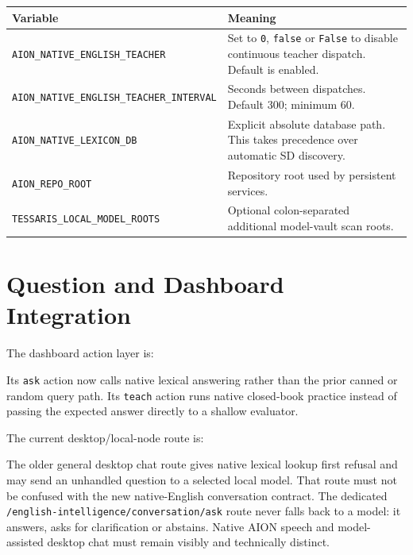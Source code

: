 \documentclass[11pt,a4paper]{article}
\begin{document}
\begin{longtable}{p{} p{}}
\toprule
Variable & Meaning \\
\midrule
\endhead
\texttt{AION\_NATIVE\_ENGLISH\_TEACHER} & Set to \texttt{0}, \texttt{false} or
\texttt{False} to disable continuous teacher dispatch. Default is enabled. \\
\texttt{AION\_NATIVE\_ENGLISH\_TEACHER\_INTERVAL} & Seconds between dispatches. Default 300;
minimum 60. \\
\texttt{AION\_NATIVE\_LEXICON\_DB} & Explicit absolute database path. This takes precedence
over automatic SD discovery. \\
\texttt{AION\_REPO\_ROOT} & Repository root used by persistent services. \\
\texttt{TESSARIS\_LOCAL\_MODEL\_ROOTS} & Optional colon-separated additional model-vault
scan roots. \\
\bottomrule
\end{longtable}

\section{Question and Dashboard Integration}

The dashboard action layer is:

\begin{quote}
\end{quote}

Its \texttt{ask} action now calls native lexical answering rather than the prior canned or
random query path. Its \texttt{teach} action runs native closed-book practice instead of
passing the expected answer directly to a shallow evaluator.

The current desktop/local-node route is:

\begin{quote}
\end{quote}

The older general desktop chat route gives native lexical lookup first refusal and may send an
unhandled question to a selected local model. That route must not be confused with the new
native-English conversation contract. The dedicated
\texttt{/english-intelligence/conversation/ask} route never falls back to a model: it answers,
asks for clarification or abstains. Native AION speech and model-assisted desktop chat must
remain visibly and technically distinct.
\end{document}
